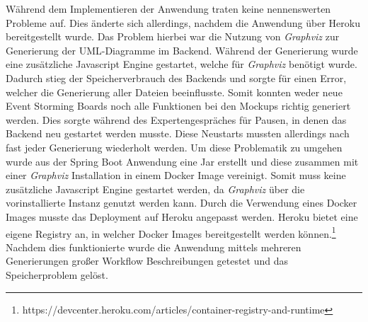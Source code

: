Während dem Implementieren der Anwendung traten keine nennenswerten Probleme auf.
Dies änderte sich allerdings, nachdem die Anwendung über Heroku bereitgestellt wurde.
Das Problem hierbei war die Nutzung von \textit{Graphviz} zur Generierung der UML-Diagramme im Backend.
Während der Generierung wurde eine zusätzliche Javascript Engine gestartet, welche für \textit{Graphviz} benötigt wurde.
Dadurch stieg der Speicherverbrauch des Backends und sorgte für einen Error, welcher die Generierung aller Dateien beeinflusste.
Somit konnten weder neue Event Storming Boards noch alle Funktionen bei den Mockups richtig generiert werden.
Dies sorgte während des Expertengespräches für Pausen, in denen das Backend neu gestartet werden musste.
Diese Neustarts mussten allerdings nach fast jeder Generierung wiederholt werden.
Um diese Problematik zu umgehen wurde aus der Spring Boot Anwendung eine Jar erstellt und diese zusammen mit einer \textit{Graphviz} Installation in einem Docker Image
vereinigt\cite*{size-problem}.
Somit muss keine zusätzliche Javascript Engine gestartet werden, da \textit{Graphviz} über die vorinstallierte Instanz genutzt werden kann.
Durch die Verwendung eines Docker Images musste das Deployment auf Heroku angepasst werden.
Heroku bietet eine eigene Registry an, in welcher Docker Images bereitgestellt werden können.\footnote{https://devcenter.heroku.com/articles/container-registry-and-runtime}
Nachdem dies funktionierte wurde die Anwendung mittels mehreren Generierungen großer Workflow Beschreibungen getestet und das Speicherproblem gelöst.

